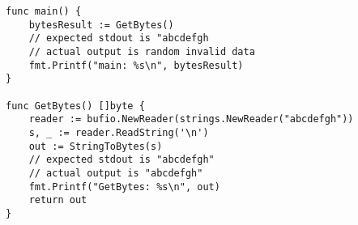\begin{lstlisting}[float=tp, language=Golang, label=lst:escape-analysis-flaw, caption=Escape analysis flaw proof of concept]
func main() {
    bytesResult := GetBytes()
    // expected stdout is "abcdefgh
    // actual output is random invalid data
    fmt.Printf("main: %s\n", bytesResult)
}

func GetBytes() []byte {
    reader := bufio.NewReader(strings.NewReader("abcdefgh"))
    s, _ := reader.ReadString('\n')
    out := StringToBytes(s)
    // expected stdout is "abcdefgh"
    // actual output is "abcdefgh"
    fmt.Printf("GetBytes: %s\n", out)
    return out
}
\end{lstlisting}